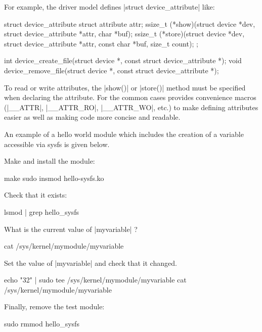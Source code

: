 \documentclass[10pt, oneside]{book}
\begin{document}
For example, the driver model defines \cpp|struct device_attribute| like:

\begin{code}
struct device_attribute {
    struct attribute attr;
    ssize_t (*show)(struct device *dev, struct device_attribute *attr,
                    char *buf);
    ssize_t (*store)(struct device *dev, struct device_attribute *attr,
                    const char *buf, size_t count);
};

int device_create_file(struct device *, const struct device_attribute *);
void device_remove_file(struct device *, const struct device_attribute *);
\end{code}

To read or write attributes, the \cpp|show()| or \cpp|store()| method must be specified when declaring the attribute.
For the common cases  provides convenience macros (\cpp|__ATTR|, \cpp|__ATTR_RO|, \cpp|__ATTR_WO|, etc.) to make defining attributes easier as well as making code more concise and readable.

An example of a hello world module which includes the creation of a variable accessible via sysfs is given below.


Make and install the module:

\begin{codebash}
make
sudo insmod hello-sysfs.ko
\end{codebash}

Check that it exists:

\begin{codebash}
lsmod | grep hello_sysfs
\end{codebash}

What is the current value of \cpp|myvariable| ?

\begin{codebash}
cat /sys/kernel/mymodule/myvariable
\end{codebash}

Set the value of \cpp|myvariable| and check that it changed.

\begin{codebash}
echo "32" | sudo tee /sys/kernel/mymodule/myvariable
cat /sys/kernel/mymodule/myvariable
\end{codebash}

Finally, remove the test module:

\begin{codebash}
sudo rmmod hello_sysfs
\end{codebash}
\end{document}
